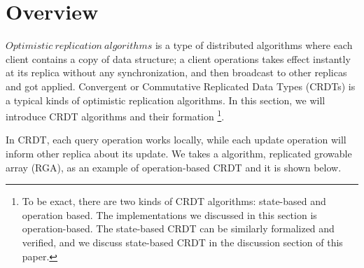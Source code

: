\section{Overview}



$\mathit{Optimistic \ replication \ algorithms}$ is a type of distributed algorithms where each client contains a copy of data structure; a client operations takes effect instantly at its replica without any synchronization, and then broadcast to other replicas and got applied. Convergent or Commutative Replicated Data Types (CRDTs) is a typical kinds of optimistic replication algorithms. In this section, we will introduce CRDT algorithms and their formation \footnote{To be exact, there are two kinds of CRDT algorithms: state-based and operation based. The implementations we discussed in this section is operation-based. The state-based CRDT can be similarly formalized and verified, and we discuss state-based CRDT in the discussion section of this paper.}.

In CRDT, each query operation works locally, while each update operation will inform other replica about its update. We takes a algorithm, replicated growable array (RGA), as an example of operation-based CRDT and it is shown below.


